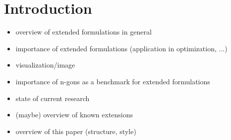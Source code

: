 \section{Introduction}

\begin{itemize}
  \item overview of extended formulations in general
  \item importance of extended formulations (application in optimization, ...)
  \item visualization/image
  \item importance of n-gons as a benchmark for extended formulations
  \item state of current research
  \item (maybe) overview of known extensions
  \item overview of this paper (structure, style)
\end{itemize}

